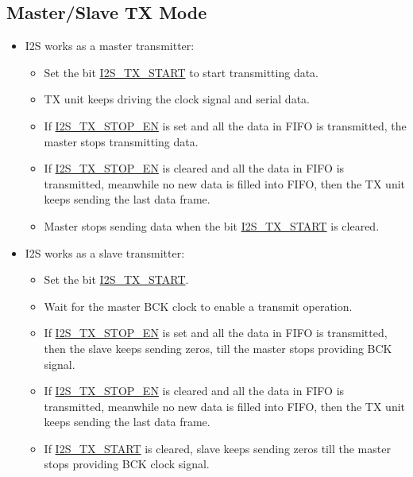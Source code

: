 \documentclass[main\_\_EN.tex]{subfiles}
\begin{document}
\subsection{Master/Slave TX Mode} \label{sec:i2s-master-slave-tx-mode}
\begin{itemize}
    \item I2S works as a master transmitter:
    \begin{itemize}
        \item Set the bit  \hyperref[fielddesc:I2STXSTART]{I2S\_TX\_START} to start transmitting data.
        \item TX unit keeps driving the clock signal and serial data.
        \item If  \hyperref[fielddesc:I2STXSTOPEN]{I2S\_TX\_STOP\_EN} is set and all the data in FIFO is transmitted, the master stops transmitting data.
        \item If  \hyperref[fielddesc:I2STXSTOPEN]{I2S\_TX\_STOP\_EN} is cleared and all the data in FIFO is transmitted, meanwhile no new data is filled into FIFO, then the TX unit keeps sending the last data frame.
        \item Master stops sending data when the bit  \hyperref[fielddesc:I2STXSTART]{I2S\_TX\_START} is cleared.
    \end{itemize}
    \item I2S works as a slave transmitter:
     \begin{itemize}
        \item Set the bit  \hyperref[fielddesc:I2STXSTART]{I2S\_TX\_START}.
        \item Wait for the master BCK clock to enable a transmit operation.
        \item If  \hyperref[fielddesc:I2STXSTOPEN]{I2S\_TX\_STOP\_EN} is set and all the data in FIFO is transmitted, then the slave keeps sending zeros, till the master stops providing BCK signal.
        \item If  \hyperref[fielddesc:I2STXSTOPEN]{I2S\_TX\_STOP\_EN} is cleared and all the data in FIFO is transmitted, meanwhile no new data is filled into FIFO, then the TX unit keeps sending the last data frame. 
        \item If \hyperref[fielddesc:I2STXSTART]{I2S\_TX\_START} is cleared, slave keeps sending zeros till the master stops providing BCK clock signal.
    \end{itemize}
\end{itemize}
\end{document}
